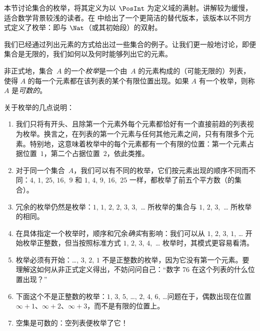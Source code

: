 \documentclass[../../../include/open-logic-section]{subfiles}
\begin{document}


\begin{editorial}
  本节讨论集合的枚举，将其定义为以 $\PosInt$ 为定义域的满射。讲解较为缓慢，适合数学背景较浅的读者。在  中给出了一个更简洁的替代版本，该版本以不同方式定义了枚举：即与 $\Nat$（或其初始段）的双射。
\end{editorial}

\begin{explain}
我们已经通过列出元素的方式给出过一些集合的例子。让我们更一般地讨论，即便集合是无限的，我们如何以及何时能够列出它的元素。
\end{explain}

\begin{defn}[枚举，非正式定义]
非正式地，集合~$A$ 的一个\emph{枚举}是一个由~$A$ 的元素构成的（可能无限的）列表，使得 $A$ 的每一个元素都在该列表的某个有限位置出现。如果 $A$ 有一个枚举，则称 $A$ 是\emph{可数的}。
\end{defn}

\begin{explain}
关于枚举的几点说明：
\begin{enumerate}
\item 我们只将有开头、且除第一个元素外每个元素都恰好有一个直接前趋的列表视为枚举。换言之，在列表的第一个元素与任何其他元素之间，只有有限多个元素。特别地，这意味着枚举中的每个元素都有一个有限的位置：第一个元素占据位置~$1$，第二个占据位置~$2$，依此类推。
\item 对于同一个集合~$A$，我们可以有不同的枚举，它们按元素出现的顺序不同而不同：$4$, $1$, $25$, $16$,~$9$ 和 $1$, $4$, $9$, $16$,~$25$ 一样，都枚举了前五个平方数（的集合）。
\item 冗余的枚举仍然是枚举：$1$, $1$, $2$, $2$, $3$, $3$,~\dots{} 所枚举的集合与 $1$, $2$, $3$,~\dots{} 所枚举的相同。
\item 在具体指定一个枚举时，顺序和冗余\emph{确实}有影响：我们可以从 $1$, $2$, $3$, $1$, \dots{} 开始枚举正整数，但当按照标准方式 $1$, $2$, $3$, $4$,~\dots{} 枚举时，其模式更容易看清。
\item 枚举必须有开始：\dots, $3$, $2$, $1$ 不是正整数的枚举，因为它没有第一个元素。要理解这如何从非正式定义得出，不妨问问自己：“数字 76 在这个列表的什么位置出现？”
\item 下面这个不是正整数的枚举：$1$, $3$, $5$, \dots, $2$, $4$, $6$, \dots\@ 问题在于，偶数出现在位置 $\infty + 1$、$\infty + 2$、$\infty + 3$，而不是有限的位置上。
\item 空集是可数的：空列表便枚举了它！
\end{enumerate}
\end{explain}
\end{document}
